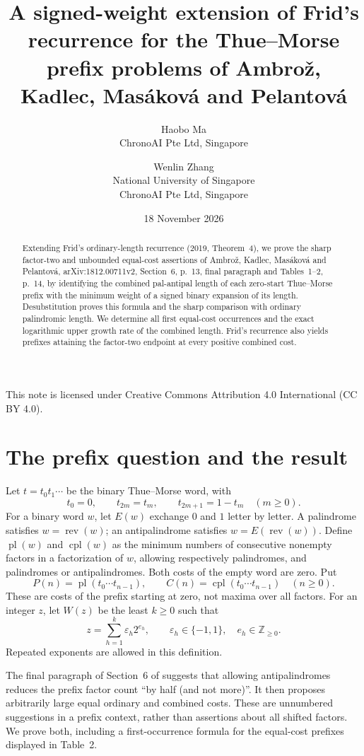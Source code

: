 \documentclass[11pt]{article}
\title{A signed-weight extension of Frid's recurrence for the Thue--Morse prefix problems of Ambro\v{z}, Kadlec, Mas\'akov\'a and Pelantov\'a}
\author{Haobo Ma\\\small ChronoAI Pte Ltd, Singapore\and
Wenlin Zhang\\\small National University of Singapore\\\small ChronoAI Pte Ltd, Singapore}
\date{18 November 2026}
\newcommand{\rev}{\operatorname{rev}}
\newcommand{\pl}{\operatorname{pl}}
\newcommand{\cl}{\operatorname{cpl}}
\begin{document}
\maketitle
\begin{abstract}
Extending Frid's ordinary-length recurrence (2019, Theorem~4), we prove
the sharp factor-two and unbounded equal-cost assertions of Ambro\v{z},
Kadlec, Mas\'akov\'a and Pelantov\'a, arXiv:1812.00711v2, Section~6,
p.~13, final paragraph and Tables~1--2, p.~14, by identifying the combined
pal-antipal length of each zero-start Thue--Morse prefix with the minimum
weight of a signed binary expansion of its length.
Desubstitution proves this formula and the sharp comparison with ordinary
palindromic length. We determine all first equal-cost occurrences and the
exact logarithmic upper growth rate of the combined length.
Frid's recurrence also yields prefixes attaining the factor-two endpoint
at every positive combined cost.
\end{abstract}
\noindent\small This note is licensed under Creative Commons Attribution 4.0
International (CC BY 4.0).\normalsize

\section{The prefix question and the result}
Let $t=t_0t_1\cdots$ be the binary Thue--Morse word, with
\[
 t_0=0,\qquad t_{2m}=t_m,\qquad t_{2m+1}=1-t_m\quad(m\geq0).
\]
For a binary word $w$, let $E(w)$ exchange $0$ and $1$ letter by letter.
A palindrome satisfies $w=\rev(w)$; an antipalindrome satisfies
$w=E(\rev(w))$. Define $\pl(w)$ and $\cl(w)$ as the minimum numbers of
consecutive nonempty factors in a factorization of $w$, allowing respectively
palindromes, and palindromes or antipalindromes. Both costs of the empty word
are zero. Put
\[
 P(n)=\pl(t_0\cdots t_{n-1}),\qquad
 C(n)=\cl(t_0\cdots t_{n-1})\quad(n\geq0).
\]
These are costs of the prefix starting at zero, not maxima over all factors.
For an integer $z$, let $W(z)$ be the least $k\geq0$ such that
\[
 z=\sum_{h=1}^{k}\varepsilon_h2^{e_h},\qquad
 \varepsilon_h\in\{-1,1\},\quad e_h\in\mathbb Z_{\geq0}.
\]
Repeated exponents are allowed in this definition.

The final paragraph of Section~6 of \cite{AKMP} suggests that allowing
antipalindromes reduces the prefix factor count ``by half (and not more)''.
It then proposes arbitrarily large equal ordinary and combined costs.
These are unnumbered suggestions in a prefix context, rather than assertions
about all shifted factors. We prove both, including a first-occurrence
formula for the equal-cost prefixes displayed in Table~2.
\end{document}
